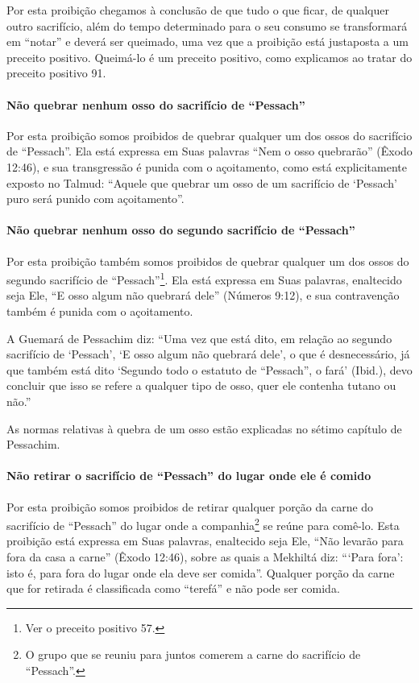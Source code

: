 Por esta proibição chegamos à conclusão de que tudo o que ficar, de
qualquer outro sacrifício, além do tempo determinado para o seu consumo
se transformará em ``notar'' e deverá ser queimado, uma vez que a
proibição está justaposta a um preceito positivo. Queimá-lo é um
preceito positivo, como explicamos ao tratar do preceito positivo 91.

\paragraph{Não quebrar nenhum osso do sacrifício de ``Pessach''}

Por esta proibição somos proibidos de quebrar qualquer um dos ossos do
sacrifício de ``Pessach''. Ela está expressa em Suas palavras ``Nem o
osso quebrarão'' (Êxodo 12:46), e sua transgressão é punida com o
açoitamento, como está explicitamente exposto no Talmud: ``Aquele que
quebrar um osso de um sacrifício de `Pessach' puro será punido com
açoitamento''.


\paragraph{Não quebrar nenhum osso do segundo sacrifício de ``Pessach''}

Por esta proibição também somos proibidos de quebrar qualquer um dos
ossos do segundo sacrifício de ``Pessach''\footnote{Ver o preceito positivo 57.}. Ela
está expressa em Suas palavras, enaltecido seja Ele, ``E osso algum não
quebrará dele'' (Números 9:12), e sua contravenção também é punida com o
açoitamento.

A Guemará de Pessachim diz: ``Uma vez que está dito, em relação ao
segundo sacrifício de `Pessach', `E osso algum não quebrará dele', o que
é desnecessário, já que também está dito `Segundo todo o estatuto de
``Pessach'', o fará' (Ibid.), devo concluir que isso se refere a qualquer
tipo de osso, quer ele contenha tutano ou não.''

As normas relativas à quebra de um osso estão explicadas no sétimo
capítulo de Pessachim.

\paragraph{Não retirar o sacrifício de ``Pessach'' do lugar onde ele é comido}

Por esta proibição somos proibidos de retirar qualquer porção da carne
do sacrifício de ``Pessach'' do lugar onde a
companhia\footnote{O grupo que se reuniu para juntos comerem a carne do sacrifício de
  ``Pessach''.} se reúne para comê-lo. Esta proibição
está expressa em Suas palavras, enaltecido seja Ele, ``Não levarão para
fora da casa a carne'' (Êxodo 12:46), sobre as quais a Mekhiltá diz:
```Para fora': isto é, para fora do lugar onde ela deve ser comida''.
Qualquer porção da carne que for retirada é classificada como ``terefá''
e não pode ser comida.

